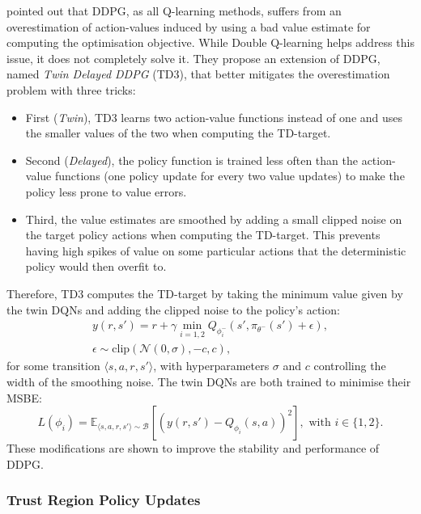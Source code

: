 \citet{Fujimoto2018_TD3} pointed out that DDPG, as all Q-learning methods, suffers from an overestimation of action-values induced by using a bad value estimate for computing the optimisation objective. While Double Q-learning helps address this issue, it does not completely solve it. They propose an extension of DDPG, named \textit{Twin Delayed DDPG} (TD3), that better mitigates the overestimation problem with three tricks:
\begin{itemize}
    \item First (\textit{Twin}), TD3 learns two action-value functions instead of one and uses the smaller values of the two when computing the TD-target. 
    \item Second (\textit{Delayed}), the policy function is trained less often than the action-value functions (one policy update for every two value updates) to make the policy less prone to value errors. 
    \item Third, the value estimates are smoothed by adding a small clipped noise on the target policy actions when computing the TD-target. This prevents having high spikes of value on some particular actions that the deterministic policy would then overfit to.
\end{itemize}
Therefore, TD3 computes the TD-target by taking the minimum value given by the twin DQNs and adding the clipped noise to the policy's action:
\begin{gather}
    y(r,s')=r+\gamma\min_{i=1,2}Q_{\phi_i^-}(s',\pi_{\theta^-}(s')+\epsilon), \\
    \epsilon\sim\text{clip}(\mathcal{N}(0,\sigma),-c,c),
\end{gather}
for some transition $\langle s,a,r,s'\rangle$, with hyperparameters $\sigma$ and $c$ controlling the width of the smoothing noise. The twin DQNs are both trained to minimise their MSBE:
\begin{equation}
    L(\phi_i)=\mathbb{E}_{\langle s,a,r,s'\rangle\sim\mathcal{B}}\left[\left(y(r,s')-Q_{\phi_i}(s,a)\right)^2\right], \text{ with } i\in\{1,2\}.
\end{equation}
These modifications are shown to improve the stability and performance of DDPG.



\subsubsection{Trust Region Policy Updates}\label{sec:DRL:PPO}


